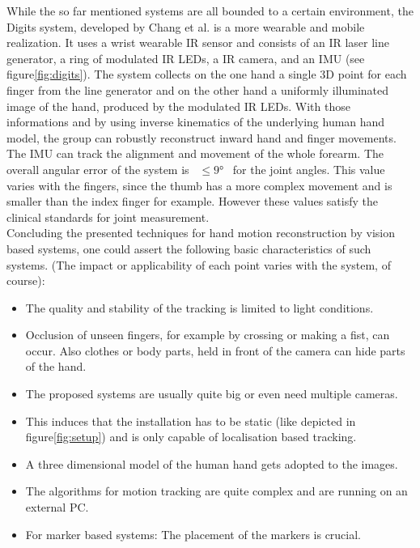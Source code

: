 While the so far mentioned systems are all bounded to a certain environment, the Digits system, developed by Chang et al. is a more wearable and mobile realization. It uses a wrist wearable \ac{IR} sensor \cite{Digits} and consists of an \ac{IR} laser line generator, a ring of modulated \ac{IR} LEDs, a \ac{IR} camera, and an \ac{IMU} (see figure\ref{fig:digits}). The system collects on the one hand a single 3D point for each finger from the line generator and on the other hand a uniformly illuminated image of the hand, produced by the modulated \ac{IR} LEDs. With those informations and by using inverse kinematics of the underlying human hand model, the group can robustly reconstruct inward hand and finger movements. The \ac{IMU} can track the alignment and movement of the whole forearm. The overall angular error of the system is~ $ \leq \ang{9}$~ for the joint angles. This value varies with the fingers, since the thumb has a more complex movement and is smaller than the index finger for example. However these values satisfy the clinical standards for joint measurement.\\

Concluding the presented techniques for hand motion reconstruction by vision based systems, one could assert the following basic characteristics of such systems. (The impact or applicability of each point varies with the system, of course):
\begin{itemize}
\item The quality and stability of the tracking is limited to light conditions.
\item Occlusion of unseen fingers, for example by crossing or making a fist, can occur. Also clothes or body parts, held in front of the camera can hide parts of the hand.
\item The proposed systems are usually quite big or even need multiple cameras.
\item This induces that the installation has to be static (like depicted in figure\ref{fig:setup}) and is only capable of localisation based tracking.
\item A three dimensional model of the human hand gets adopted to the images.
\item The algorithms for motion tracking are quite complex and are running on an external PC.
\item For marker based systems: The placement of the markers is crucial.
\end{itemize}

